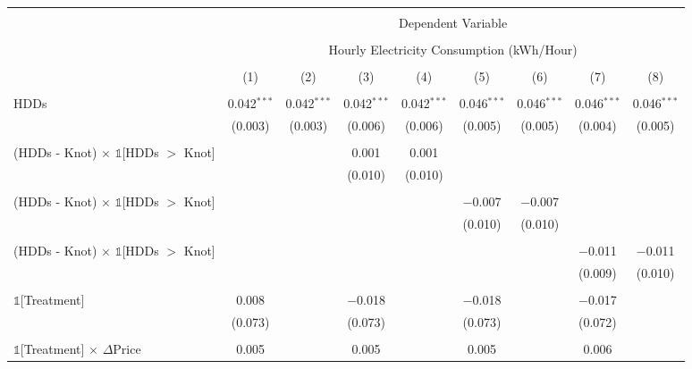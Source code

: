 
\begin{table}[!htbp] \centering 
  \caption{Breakdonw of Average Treatment Effects in the Peak Rate Period: As a Function of Rate Changes} 
  \label{Table:Breakdown-of-Average-Treatement-Effects-in-the-Peak-Rate-Period_As-a-Function-of-Rate-Changes} 
\scriptsize
\begin{longtable}{@{\extracolsep{0pt}}lcccccccc} 
\\[-1.8ex]\hline 
\hline \\[-1.8ex] 
 & \multicolumn{8}{c}{Dependent Variable} \\ 
\cline{2-9} 
\\[-1.8ex] & \multicolumn{8}{c}{Hourly Electricity Consumption  (kWh/Hour)} \\ 
\\[-1.8ex] & (1) & (2) & (3) & (4) & (5) & (6) & (7) & (8)\\ 
\hline \\[-1.8ex] \endhead
 HDDs & 0.042$^{***}$ & 0.042$^{***}$ & 0.042$^{***}$ & 0.042$^{***}$ & 0.046$^{***}$ & 0.046$^{***}$ & 0.046$^{***}$ & 0.046$^{***}$ \\ 
  & (0.003) & (0.003) & (0.006) & (0.006) & (0.005) & (0.005) & (0.004) & (0.005) \\ 
  & & & & & & & & \\ 
 (HDDs - Knot) $\times$ $\mathbb{1}$[HDDs $>$ Knot] &  &  & 0.001 & 0.001 &  &  &  &  \\ 
  &  &  & (0.010) & (0.010) &  &  &  &  \\ 
  & & & & & & & & \\ 
 (HDDs - Knot) $\times$ $\mathbb{1}$[HDDs $>$ Knot] &  &  &  &  & $-$0.007 & $-$0.007 &  &  \\ 
  &  &  &  &  & (0.010) & (0.010) &  &  \\ 
  & & & & & & & & \\ 
 (HDDs - Knot) $\times$ $\mathbb{1}$[HDDs $>$ Knot] &  &  &  &  &  &  & $-$0.011 & $-$0.011 \\ 
  &  &  &  &  &  &  & (0.009) & (0.010) \\ 
  & & & & & & & & \\ 
 $\mathbb{1}$[Treatment] & 0.008 &  & $-$0.018 &  & $-$0.018 &  & $-$0.017 &  \\ 
  & (0.073) &  & (0.073) &  & (0.073) &  & (0.072) &  \\ 
  & & & & & & & & \\ 
 $\mathbb{1}$[Treatment] $\times$ $\Delta$Price & 0.005 &  & 0.005 &  & 0.005 &  & 0.006 &  \\ 

\end{longtable}
\end{table}
